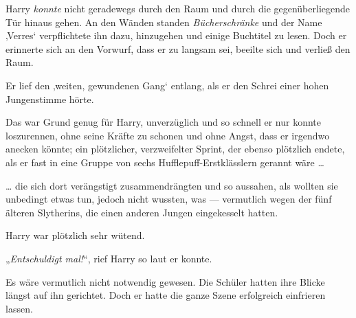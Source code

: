 Harry \emph{konnte} nicht geradewegs durch den Raum und durch die gegenüberliegende Tür hinaus gehen. An den Wänden standen \emph{Bücherschränke} und der Name ‚Verres‘ verpflichtete ihn dazu, hinzugehen und einige Buchtitel zu lesen. Doch er erinnerte sich an den Vorwurf, dass er zu langsam sei, beeilte sich und verließ den Raum.

Er lief den ‚weiten, gewundenen Gang‘ entlang, als er den Schrei einer hohen Jungenstimme hörte.

Das war Grund genug für Harry, unverzüglich und so schnell er nur konnte loszurennen, ohne seine Kräfte zu schonen und ohne Angst, dass er irgendwo anecken könnte; ein plötzlicher, verzweifelter Sprint, der ebenso plötzlich endete, als er fast in eine Gruppe von sechs Hufflepuff-Erstklässlern gerannt wäre …

… die sich dort verängstigt zusammendrängten und so aussahen, als wollten sie unbedingt etwas tun, jedoch nicht wussten, was — vermutlich wegen der fünf älteren Slytherins, die einen anderen Jungen eingekesselt hatten.

Harry war plötzlich sehr wütend.

„\emph{Entschuldigt mal!}“, rief Harry so laut er konnte.

Es wäre vermutlich nicht notwendig gewesen. Die Schüler hatten ihre Blicke längst auf ihn gerichtet. Doch er hatte die ganze Szene erfolgreich einfrieren lassen.

